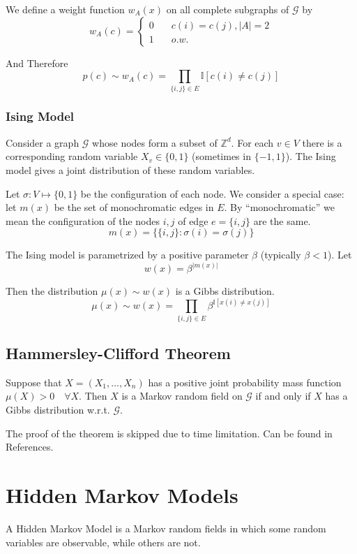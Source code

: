         We define a weight function $w_A(x)$ on all complete subgraphs of $\mathcal{G}$ by
        \[ w_A(c) = \begin{cases}
            0 &\quad c(i) = c(j), |A|=2\\
            1 &\quad o.w.
        \end{cases} \]

        And Therefore
        \[ p(c) \sim w_A(c) = \prod_{\{i,j\} \in E}\mathbb{I}[c(i) \neq c(j)] \]

        \subsubsection{Ising Model}
        Consider a graph $\mathcal{G}$ whose nodes form a subset of $\mathbb{Z}^d$. For each $v \in V$ there is a corresponding random variable $X_v \in \{0,1\}$ (sometimes in $\{-1,1\}$). The Ising model gives a joint distribution of these random variables.

        Let $\sigma: V \mapsto \{0,1\}$ be the configuration of each node. We consider a special case: let $m(x)$ be the set of monochromatic edges in $E$. By ``monochromatic'' we mean the configuration of the nodes $i,j$ of edge $e=\{i,j\}$ are the same.
        \[ m(x) = \{\{i,j\}: \sigma(i) = \sigma(j)\} \]

        The Ising model is parametrized by a positive parameter $\beta$ (typically $\beta < 1$). Let
        \[ w(x) = \beta^{|m(x)|} \]

        Then the distribution $\mu(x) \sim w(x)$ is a Gibbs distribution.
        \[ \mu(x) \sim w(x) = \prod_{\{i,j\} \in E}\beta^{\mathbb{I}[x(i)\neq x(j)]} \]

    \subsection{Hammersley-Clifford Theorem}
        \begin{theorem}\label{Thm:HammersleyClifford}
            Suppose that $X=(X_1,\dots,X_n)$ has a positive joint probability mass function $\mu(X) > 0 \quad \forall X$. Then $X$ is a Markov random field on $\mathcal{G}$ if and only if $X$ has a Gibbs distribution w.r.t. $\mathcal{G}$.
        \end{theorem}

        The proof of the theorem is skipped due to time limitation. Can be found in References.


\section{Hidden Markov Models}
    A Hidden Markov Model is a Markov random fields in which some random variables are observable, while others are not.

